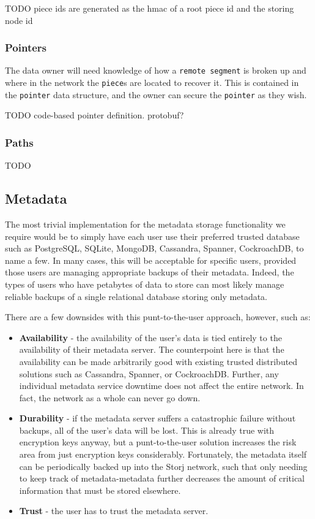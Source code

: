 \documentclass[a4paper,10pt]{article} \usepackage[utf8]{inputenc}
\newcommand{\x}[1]{{\tt #1}} \newcommand{\code}[1]{{\tt #1}}
\newcommand{\todo}[1]{{\color{red} TODO #1 }}
\begin{document}
\todo{piece ids are generated as the hmac of a root piece id and the storing
node id}

\subsubsection{Pointers}

The data owner will need knowledge of how a \x{remote segment} is broken up and
where in the network the \x{piece}s are located to recover it. This is contained
in the \x{pointer} data structure, and the owner can secure the \x{pointer} as
they wish.

\todo{code-based pointer definition. protobuf?}

\subsubsection{Paths}

\todo{}

\subsection{Metadata}

The most trivial implementation for the metadata storage functionality we
require would be to simply have each user use their preferred trusted database
such as PostgreSQL, SQLite, MongoDB, Cassandra\cite{cassandra},
Spanner\cite{spanner}, CockroachDB, to name a few. In many cases, this will
be acceptable for specific users, provided those users are managing appropriate
backups of their metadata. Indeed, the types of users who have petabytes of data
to store can most likely manage reliable backups of a single relational database
storing only metadata.

There are a few downsides with this punt-to-the-user approach, however, such as:
\begin{itemize}
\item {\bf Availability} - the availability of the user's data
is tied entirely to the availability of their metadata server. The counterpoint
here is that the availability can be made arbitrarily good with existing trusted
distributed solutions such as Cassandra, Spanner, or CockroachDB. Further, any
individual metadata service downtime does not affect the entire network. In
fact, the network as a whole can never go down.
\item {\bf Durability} -
if the metadata server suffers a catastrophic failure without backups, all of
the user's data will be lost. This is already true with encryption keys anyway,
but a punt-to-the-user solution increases the risk area from just encryption
keys considerably. Fortunately, the metadata itself can be periodically backed
up into the Storj network,
such that only needing to keep track of metadata-metadata
further decreases the amount of critical information that must be stored
elsewhere.
\item {\bf Trust} - the user has to trust the metadata server.
\end{itemize}
\end{document}
